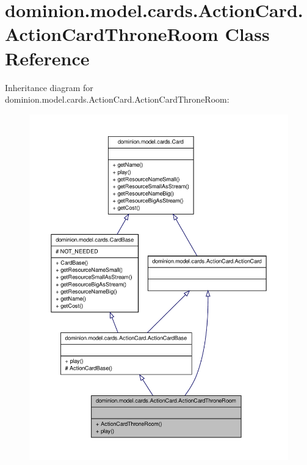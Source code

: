 \hypertarget{classdominion_1_1model_1_1cards_1_1ActionCard_1_1ActionCardThroneRoom}{\section{dominion.\-model.\-cards.\-Action\-Card.\-Action\-Card\-Throne\-Room \-Class \-Reference}
\label{classdominion_1_1model_1_1cards_1_1ActionCard_1_1ActionCardThroneRoom}
}


\-Inheritance diagram for dominion.\-model.\-cards.\-Action\-Card.\-Action\-Card\-Throne\-Room\-:
\nopagebreak
\begin{figure}[H]
\begin{center}
\leavevmode
\includegraphics[width=350pt]{classdominion_1_1model_1_1cards_1_1ActionCard_1_1ActionCardThroneRoom__inherit__graph}
\end{center}
\end{figure}


